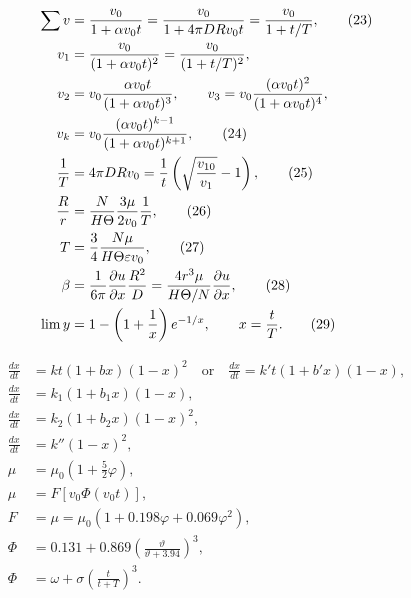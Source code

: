 \begin{align}
\sum v&=\frac{v_0}{1+\alpha v_0t}=\frac{v_0}{1+4\pi DRv_0t}=\frac{v_0}{1+t/T},\tag{23}\\
v_1&=\frac{v_0}{(1+\alpha v_0t)^2}=\frac{v_0}{(1+t/T)^2},\notag\\
v_2&=v_0\frac{\alpha v_0t}{(1+\alpha v_0t)^3},\qquad
v_3=v_0\frac{(\alpha v_0t)^2}{(1+\alpha v_0t)^4},\notag\\
v_k&=v_0\frac{(\alpha v_0t)^{k-1}}{(1+\alpha v_0t)^{k+1}},\tag{24}\\
\frac1T&=4\pi DRv_0=\frac1t\left(\sqrt{\frac{v_{10}}{v_1}}-1\right),\tag{25}\\
\frac{R}{r}&=\frac{N}{H\Theta}\frac{3\mu}{2v_0}\frac1T,\tag{26}\\
T&=\frac34\frac{N\mu}{H\Theta\varepsilon v_0},\tag{27}\\
\beta&=\frac{1}{6\pi}\frac{\partial u}{\partial x}\frac{R^2}{D}
=\frac{4r^3\mu}{H\Theta/N}\frac{\partial u}{\partial x},\tag{28}\\
\lim y&=1-\left(1+\frac1x\right)e^{-1/x},\qquad x=\frac{t}{T}.\tag{29}
\end{align}

\begin{align}
\frac{dx}{dt}&=kt(1+bx)(1-x)^2
\quad\text{or}\quad
\frac{dx}{dt}=k't(1+b'x)(1-x),\tag{30}\\
\frac{dx}{dt}&=k_1(1+b_1x)(1-x),\tag{31.1}\\
\frac{dx}{dt}&=k_2(1+b_2x)(1-x)^2,\tag{31.2}\\
\frac{dx}{dt}&=k''(1-x)^2,\tag{31.3}\\
\mu&=\mu_0\left(1+\frac52\varphi\right),\tag{32}\\
\mu&=F\!\left[v_0\Phi(v_0t)\right],\tag{33}\\
F&=\mu=\mu_0\left(1+0.198\varphi+0.069\varphi^2\right),\tag{34}\\
\Phi&=0.131+0.869\left(\frac{\vartheta}{\vartheta+3.94}\right)^3,\tag{35}\\
\Phi&=\omega+\sigma\left(\frac{t}{t+T}\right)^3.\tag{36}
\end{align}

\clearpage
